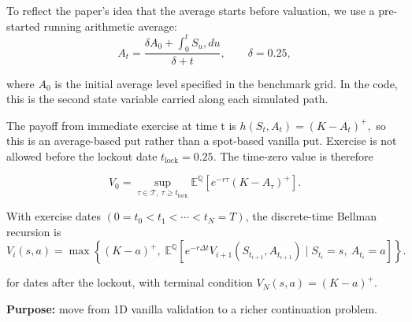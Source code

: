\documentclass[
  11pt,
  ignorenonframetext,
  aspectratio=169,
]{beamer}
\begin{document}
\begin{frame}{}
\label{section-1}
To reflect the paper's idea that the average starts before valuation, we
use a pre-started running arithmetic average: \[
A_t = \frac{\delta A_0 + \int_0^t S_u,du}{\delta + t},
\qquad \delta = 0.25,
\]

where \(A_0\) is the initial average level specified in the benchmark
grid. In the code, this is the second state variable carried along each
simulated path.

The payoff from immediate exercise at time t is
\(h(S_t,A_t)=(K-A_t)^+,\) so this is an average-based put rather than a
spot-based vanilla put. Exercise is not allowed before the lockout date
\(t_{\mathrm{lock}}=0.25\). The time-zero value is therefore

\[
V_0 = \sup_{\tau \in \mathcal T,\ \tau \ge t_{\mathrm{lock}}}
\mathbb E^{\mathbb Q} \left[e^{-r\tau}(K-A_\tau)^+\right].
\]
\end{frame}

\begin{frame}{}
\label{section-2}
With exercise dates \((0=t_0<t_1<\cdots<t_N=T)\), the discrete-time
Bellman recursion is \[
V_i(s,a)
=
\max\left\{
(K-a)^+,\;
\mathbb{E}^{\mathbb{Q}}\!\left[
e^{-r\Delta t}V_{i+1}(S_{t_{i+1}},A_{t_{i+1}})
\mid S_{t_i}=s,\ A_{t_i}=a
\right]
\right\}.
\]

for dates after the lockout, with terminal condition
\(V_N(s,a)=(K-a)^{+}.\)

\textbf{Purpose:} move from 1D vanilla validation to a richer
continuation problem.
\end{frame}
\end{document}
